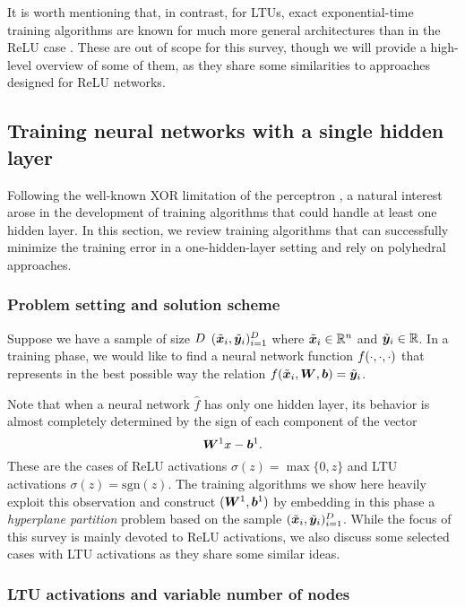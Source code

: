 It is worth mentioning that, in contrast, for LTUs, exact exponential-time training algorithms are known for much more general architectures than in the ReLU case \citep{khalife2022neural,ergen2023globally}. These are out of scope for this survey, though we will provide a high-level overview of some of them, as they share some similarities to approaches designed for ReLU networks.

\subsection{Training neural networks with a single hidden layer}

Following the well-known XOR limitation of the perceptron \citep{perceptrons}, a natural interest arose in the development of training algorithms that could handle at least one hidden layer. In this section, we review training algorithms that can successfully minimize the training error in a one-hidden-layer setting and rely on polyhedral approaches.

\subsubsection{Problem setting and solution scheme}

Suppose we have a sample of size $D$ $(\tilde{{\bm{x}}}_i,\tilde{{\bm{y}}}_i)_{i=1}^D$ where $\tilde{{\bm{x}}}_i \in \mathbb{R}^n$ and $\tilde{{\bm{y}}}_i\in \mathbb{R}$. In a training phase, we would like to find a neural network function $f(\cdot,\cdot,\cdot)$ that represents in the best possible way the relation $f(\tilde{{\bm{x}}}_i,{\bm{W}},{\bm{b}}) = \tilde{{\bm{y}}}_i$.

Note that when a neural network $\hat{f}$ has only one hidden layer, its behavior is almost completely determined by the sign of each component of the vector
%
\[{\bm{W}}^1 x - {\bm{b}}^1.\]
%
These are the cases of ReLU activations $\sigma(z) = \max\{0,z\}$ and LTU activations $\sigma(z) = \text{sgn}(z)$. The training algorithms we show here heavily exploit this observation and construct $({\bm{W}}^1,{\bm{b}}^1)$ by embedding in this phase a \emph{hyperplane partition} problem based on the sample $(\tilde{{\bm{x}}}_i,\tilde{{\bm{y}}}_i)_{i=1}^D$.
%
While the focus of this survey is mainly devoted to ReLU activations, we also discuss some selected cases with LTU activations as they share some similar ideas.

\subsubsection{LTU activations and variable number of nodes}

